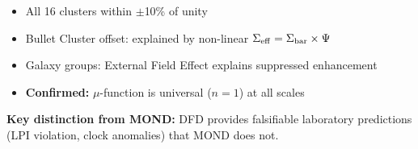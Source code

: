\begin{tcolorbox}[colback=blue!5!white, colframe=blue!50!black, title=Summary: Galactic and Cluster Dynamics]
\begin{itemize}
\item All 16 clusters within $\pm$10\% of unity
\item Bullet Cluster offset: explained by non-linear $\Sigma_{\rm eff} = \Sigma_{\rm bar} \times \Psi$
\item Galaxy groups: External Field Effect explains suppressed enhancement
\item \textbf{Confirmed:} $\mu$-function is universal ($n=1$) at all scales
\end{itemize}
\textbf{Key distinction from MOND:} DFD provides falsifiable laboratory predictions (LPI violation, clock anomalies) that MOND does not.
\end{tcolorbox}
